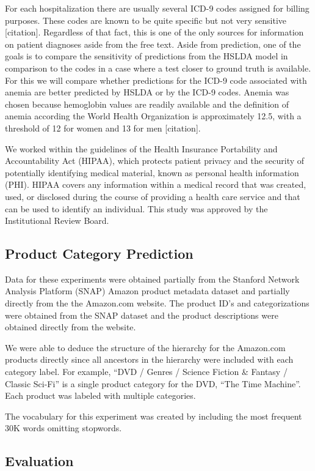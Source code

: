 \documentclass{article}
\begin{document}
For each hospitalization there are usually several ICD-9 codes assigned
for billing purposes. These codes are known to be quite specific but
not very sensitive {[}citation{]}. Regardless of that fact, this is
one of the only sources for information on patient diagnoses aside
from the free text. Aside from prediction, one of the goals is to
compare the sensitivity of predictions from the HSLDA model in comparison
to the codes in a case where a test closer to ground truth is available.
For this we will compare whether predictions for the ICD-9 code associated
with anemia are better predicted by HSLDA or by the ICD-9 codes. Anemia
was chosen because hemoglobin values are readily available and the
definition of anemia according the World Health Organization is approximately
12.5, with a threshold of 12 for women and 13 for men {[}citation{]}.

We worked within the guidelines of the Health Insurance Portability
and Accountability Act (HIPAA), which protects patient privacy and
the security of potentially identifying medical material, known as
personal health information (PHI). HIPAA covers any information within
a medical record that was created, used, or disclosed during the course
of providing a health care service and that can be used to identify
an individual. This study was approved by the Institutional Review
Board.


\subsection{Product Category Prediction}

Data for these experiments were obtained partially from the Stanford
Network Analysis Platform (SNAP) Amazon product metadata dataset and
partially directly from the the Amazon.com website. The product ID's
and categorizations were obtained from the SNAP dataset and the product
descriptions were obtained directly from the website.

We were able to deduce the structure of the hierarchy for the Amazon.com
products directly since all ancestors in the hierarchy were included
with each category label. For example, {}``DVD / Genres / Science
Fiction \& Fantasy / Classic Sci-Fi'' is a single product category
for the DVD, {}``The Time Machine''. Each product was labeled with
multiple categories.

The vocabulary for this experiment was created by including the most
frequent 30K words omitting stopwords.


\subsection{Evaluation}
\end{document}
